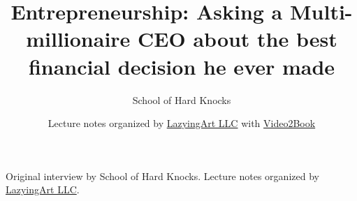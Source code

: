 \documentclass[11pt,oneside]{book}
\begin{document}
\frontmatter
\title{Entrepreneurship: Asking a Multi-millionaire CEO about the best financial decision he ever made}
\author{School of Hard Knocks}
\date{Lecture notes organized by \href{https://lazying.art}{LazyingArt LLC} with \href{https://github.com/lachlanchen/Video2Book}{Video2Book}}
\maketitle
\begin{center}
\small Original interview by School of Hard Knocks. Lecture notes organized by \href{https://lazying.art}{LazyingArt LLC}.
\end{center}
\clearpage
\mainmatter

\end{document}
